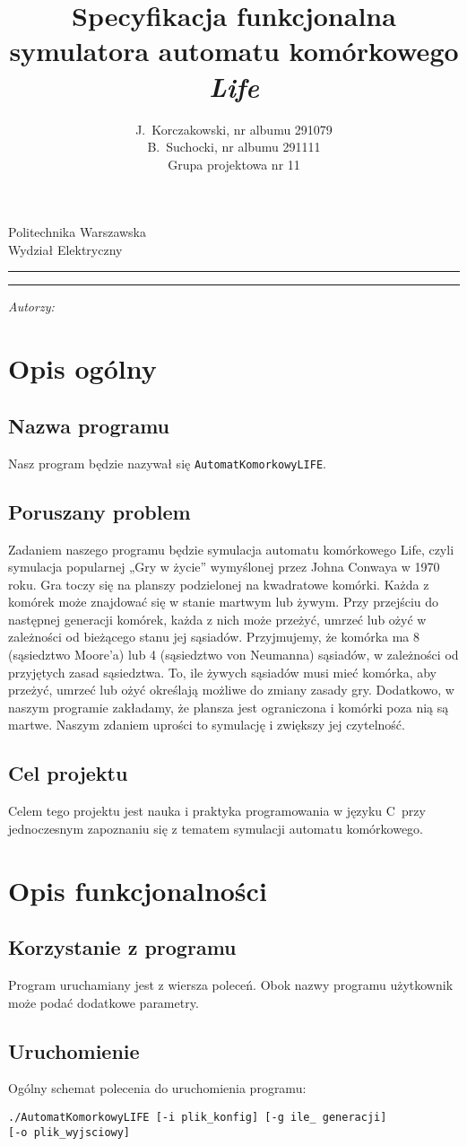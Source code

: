 \documentclass[a4paper,11pt, notitlepage ]{article}
\author{J.~Korczakowski, nr albumu 291079\\ B.~Suchocki, nr albumu 291111\\ Grupa projektowa nr 11}
\title{Specyfikacja funkcjonalna symulatora automatu komórkowego \textsl{Life}}
\makeatletter
\newcommand{\linia}{\rule{\linewidth}{0.4mm}}
\renewcommand{\maketitle}{\begin{titlepage}
    \vspace*{1cm}
    \begin{center}\small
    Politechnika Warszawska\\
    Wydział Elektryczny
    \end{center}
    \vspace{3cm}
    \noindent\linia
    \begin{center}
      \LARGE \textsc{\@title}
         \end{center}
     \linia
    \vspace{0.5cm}
    \begin{flushright}
    \begin{minipage}{8cm}
    \textit{\small Autorzy:}\\
    \normalsize \textsc{\@author} \par
    \end{minipage}
    \end{flushright}
    \vspace*{\stretch{6}}
    \begin{center}
    \@date
    \end{center}
  \end{titlepage}%
}
\makeatother
\begin{document}
\maketitle
\setcounter{page}{2}
\section{Opis ogólny}
\subsection{Nazwa programu}
Nasz program będzie nazywał się \verb+AutomatKomorkowyLIFE+.
\subsection{Poruszany problem}
Zadaniem naszego programu będzie symulacja automatu komórkowego Life, czyli symulacja popularnej „Gry w życie” wymyślonej przez Johna Conwaya w 1970 roku. Gra toczy się na planszy podzielonej na kwadratowe komórki. Każda z komórek może znajdować się w stanie martwym lub żywym. Przy przejściu do następnej generacji komórek, każda z nich może przeżyć, umrzeć lub ożyć w zależności od bieżącego stanu jej sąsiadów. Przyjmujemy, że komórka ma 8 (sąsiedztwo Moore’a) lub 4 (sąsiedztwo von Neumanna) sąsiadów, w zależności od przyjętych zasad sąsiedztwa. To, ile żywych sąsiadów musi mieć komórka, aby przeżyć, umrzeć lub ożyć określają możliwe do zmiany zasady gry.
\newline \indent Dodatkowo, w naszym programie zakładamy, że plansza jest ograniczona i komórki poza nią są martwe. Naszym zdaniem uprości to symulację i zwiększy jej czytelność.
\subsection{Cel projektu}
Celem tego projektu jest nauka i praktyka programowania w języku C~przy jednoczesnym zapoznaniu się z tematem symulacji automatu komórkowego.
\section{Opis funkcjonalności}
\subsection{Korzystanie z programu}
Program uruchamiany jest z wiersza poleceń. Obok nazwy programu użytkownik może podać dodatkowe parametry.
\subsection{Uruchomienie}
Ogólny schemat polecenia do uruchomienia programu:
\begin{verbatim}
./AutomatKomorkowyLIFE [-i plik_konfig] [-g ile_ generacji] 
[-o plik_wyjsciowy]
\end{verbatim}
\end{document}
